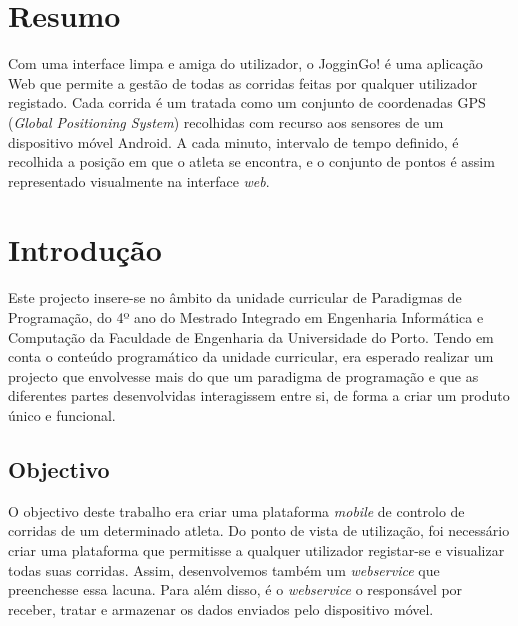 \documentclass[15pt,a4paper]{article}
\begin{document}
\newpage

\tableofcontents



\newpage

\section{Resumo}

Com uma interface limpa e amiga do utilizador, o JogginGo! é uma aplicação Web que permite a gestão de todas as corridas feitas por qualquer utilizador registado. Cada corrida é um tratada como um conjunto de coordenadas GPS (\textit{Global Positioning System}) recolhidas com recurso aos sensores de um dispositivo móvel Android. A cada minuto, intervalo de tempo definido, é recolhida a posição em que o atleta se encontra, e o conjunto de pontos é assim representado visualmente na interface \textit{web}. 

\newpage
\section{Introdução}

Este projecto insere-se no âmbito da unidade curricular de Paradigmas de Programação, do 4º ano do Mestrado Integrado em Engenharia Informática e Computação da Faculdade de Engenharia da Universidade do Porto. Tendo em conta o conteúdo programático da unidade curricular, era esperado realizar um projecto que envolvesse mais do que um paradigma de programação e que as diferentes partes desenvolvidas interagissem entre si, de forma a criar um produto único e funcional.

\subsection{Objectivo}

O objectivo deste trabalho era criar uma plataforma \textit{mobile} de controlo de corridas de um determinado atleta. Do ponto de vista de utilização, foi necessário criar uma plataforma que permitisse a qualquer utilizador registar-se e visualizar todas suas corridas. Assim, desenvolvemos também um \textit{webservice} que preenchesse essa lacuna. Para além disso, é o \textit{webservice} o responsável por receber, tratar e armazenar os dados enviados pelo dispositivo móvel.
\end{document}
